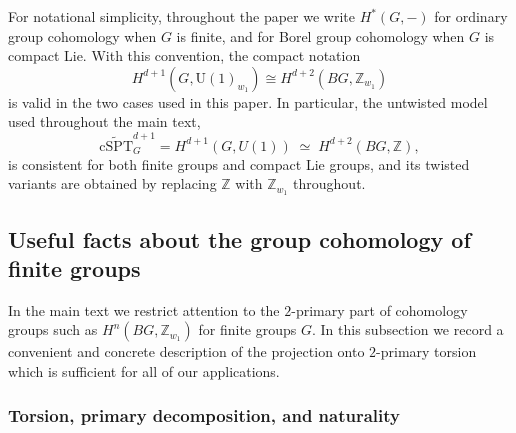 \documentclass[aps,prx,reprint,superscriptaddress,twocolumn,amsmath,amssymb,amsfonts, nofootinbib]{revtex4-2}
\newcommand{\U}{\text{U}}
\newcommand{\tcspt}{\widetilde{\text{cSPT}}^{d+1}_{G}}
\theoremstyle{apsstyle}
\begin{document}
\bigskip 

For notational simplicity, throughout the paper we write $H^*(G,-)$ for
ordinary group cohomology when $G$ is finite, and for Borel group
cohomology when $G$ is compact Lie. With this convention, the compact
notation
\begin{equation}
    H^{d+1}(G,\U(1)_{w_1})
    \cong
    H^{d+2}(BG,\mathbb{Z}_{w_1})
\end{equation}
is valid in the two cases used in this paper. In particular, the untwisted model used throughout the main text,
\begin{equation}
    \tcspt = H^{d+1}(G,U(1))
    \;\simeq\;
    H^{d+2}(BG,\mathbb{Z}),
\end{equation}
is consistent for both finite groups and compact Lie groups, and its twisted variants are obtained by replacing $\mathbb{Z}$ with $\mathbb{Z}_{w_1}$ throughout.

\subsection{Useful facts about the group cohomology of finite groups}
\label{app:coh_finite}

In the main text we restrict attention to the $2$-primary part of cohomology groups such as $H^{n}(BG,\mathbb{Z}_{w_1})$ for finite groups $G$. In this subsection we record a convenient and concrete description of the projection onto $2$-primary torsion which is sufficient for all of our applications.

\subsubsection{Torsion, primary decomposition, and naturality}
\end{document}
